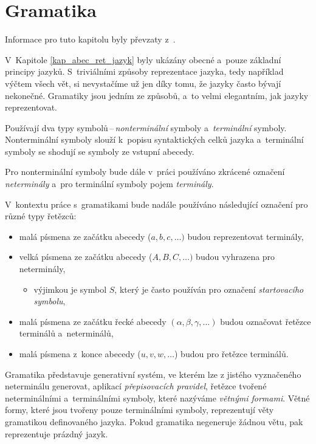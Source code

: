 \section{Gramatika}

Informace pro tuto kapitolu byly převzaty z~\cite{TIN-opora}.

V~Kapitole \ref{kap_abec_ret_jazyk} byly ukázány obecné a~pouze základní principy jazyků.
S~triviálními způsoby reprezentace jazyka, tedy například výčtem všech vět, si nevystačíme už jen díky tomu, že jazyky často bývají nekonečné.
Gramatiky jsou jedním ze způsobů, a~to velmi elegantním, jak jazyky reprezentovat.

Používají dva typy symbolů\,--\,\emph{nonterminální} symboly a~\emph{terminální} symboly.
Nonterminální symboly slouží k~popisu syntaktických celků jazyka a~terminální symboly se shodují se symboly ze vstupní abecedy.

\begin{convention}
    Pro nonterminální symboly bude dále v~práci používáno zkrácené označení \emph{neterminály} a~pro terminální symboly pojem \emph{terminály}.
\end{convention}

\begin{convention}\label{conv_oznaceni_symbolu}
    V~kontextu práce s~gramatikami bude nadále používáno následující označení pro různé typy řetězců:
    \begin{itemize}
        \item malá písmena ze začátku abecedy ($a, b, c,\ldots)$ budou reprezentovat terminály,
        \item velká písmena ze začátku abecedy ($A, B, C,\ldots)$ budou vyhrazena pro neterminály,
        \begin{itemize}[label=$\circ$]
            \item výjimkou je symbol $S$, který je často používán pro označení \emph{startovacího symbolu},
        \end{itemize}
        \item malá písmena ze začátku řecké abecedy $(\alpha, \beta, \gamma,\ldots)$ budou označovat řetězce terminálů a~neterminálů,
        \item malá písmena z~konce abecedy ($u, v, w,\ldots$) budou pro řetězce terminálů.
    \end{itemize}
\end{convention}

Gramatika představuje generativní systém, ve kterém lze z jistého vyznačeného neterminálu generovat, aplikací \emph{přepisovacích pravidel}, řetězce tvořené neterminálními a~terminálními symboly, které nazýváme \emph{větnými formami}. 
Větné formy, které jsou tvořeny pouze terminálními symboly, reprezentují věty gramatikou definovaného jazyka.
Pokud gramatika negeneruje žádnou větu, pak reprezentuje prázdný jazyk.

